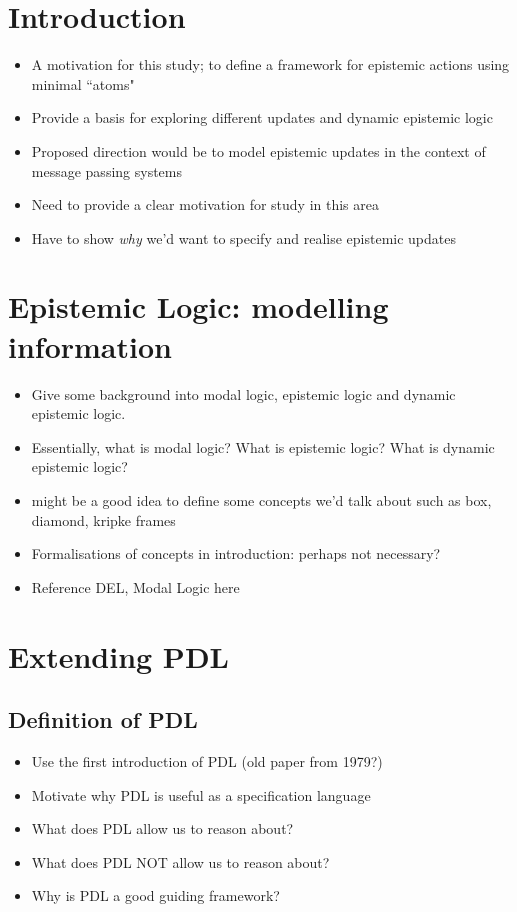 \documentclass[10pt, a4paper, twoside]{article}
\begin{document}
\begin{comment}
The literature review should be about 3000-5000 words long.
I would probably aim for around 4000.
You'll need about 5 to 10 papers. Aim for 10?
\end{comment}

\tableofcontents

\vfill
\pagebreak


\section{Introduction}\label{intro}
\begin{itemize}
  \item A motivation for this study; to define a framework for epistemic actions
  using minimal ``atoms"
  \item Provide a basis for exploring different updates and dynamic epistemic
  logic
  \item Proposed direction would be to model epistemic updates in the context of
  message passing systems
  \item Need to provide a clear motivation for study in this area
  \item Have to show {\em why} we'd want to specify and realise epistemic
  updates
\end{itemize}

\section{Epistemic Logic: modelling information}\label{epistemics}
\begin{itemize}
\item Give some background into modal logic, epistemic logic and dynamic
epistemic logic.
\item Essentially, what is modal logic? What is epistemic logic? What is dynamic
epistemic logic?
\item might be a good idea to define some concepts we'd talk about such as box,
  diamond, kripke frames
\item Formalisations of concepts in introduction: perhaps not necessary?
\item Reference DEL, Modal Logic here
\end{itemize}

\section{Extending PDL}\label{pdlExtend}
\subsection{Definition of PDL} \label{pdlDefine}
\begin{itemize}
  \item Use the first introduction of PDL (old paper from 1979?)
  \item Motivate why PDL is useful as a specification language
  \item What does PDL allow us to reason about?
  \item What does PDL NOT allow us to reason about?
  \item Why is PDL a good guiding framework?
\end{itemize}
\end{document}
